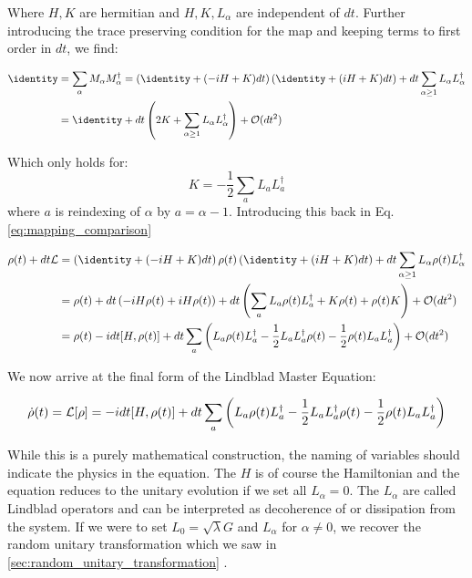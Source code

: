 Where $H, K$ are hermitian and $H, K, L_\alpha$ are independent of $dt$. Further introducing the trace preserving condition for the map and keeping terms to first order in $dt$, we find:
\begin{fullwidth}
\begin{align}
    \identity &= \sum_\alpha M_\alpha M_\alpha^\dagger = \left(\identity + (-iH + K)dt\right)\left(\identity + (iH + K)dt\right) + dt \sum_{\alpha \geq 1} L_\alpha L_\alpha^\dagger \\
    &= \identity + dt \left(2K +  \sum_{\alpha\geq 1} L_\alpha L_\alpha^\dagger\right) + \mathcal{O}(dt^2) 
\end{align}
\end{fullwidth}
Which only holds for:
\begin{equation}
    K = - \frac12 \sum_a L_a L_a^\dagger
\end{equation}
where $a$ is reindexing of $\alpha$ by $a = \alpha - 1$. Introducing this back in Eq. \ref{eq:mapping_comparison} 
\begin{fullwidth}
\begin{align}
    \rho(t) + dt \lindbladian &= \left(\identity + (-iH + K)dt\right)\rho(t)\left(\identity + (iH + K)dt\right) + dt \sum_{\alpha \geq 1} L_\alpha \rho(t) L_\alpha^\dagger \\
    &= \rho(t) + dt \left(-i H \rho(t) + iH \rho(t)\right) + dt \left(\sum_a L_a \rho(t) L_a^\dagger + K \rho(t) + \rho(t) K\right) + \mathcal{O}(dt^2) \\
    &= \rho(t) -i dt[H, \rho(t)] + dt \sum_a \left(L_a \rho(t) L_a^\dagger - \frac12 L_a L_a^\dagger \rho(t) - \frac12 \rho(t)L_a L_a^\dagger  \right) + \mathcal{O}(dt^2)
\end{align}
\end{fullwidth}
We now arrive at the final form of the Lindblad Master Equation:
\begin{fullwidth}
\begin{equation}\label{eq:lindblad_master_equation}
    \dot{\rho}(t) = \mathcal{L}[\rho] = -i dt[H, \rho(t)] +  dt \sum_a \left(L_a \rho(t) L_a^\dagger - \frac12 L_a L_a^\dagger \rho(t) - \frac12 \rho(t)L_a L_a^\dagger  \right)
\end{equation}
\end{fullwidth}
While this is a purely mathematical construction, the naming of variables should indicate the physics in the equation. The $H$ is of course the Hamiltonian and the equation reduces to the unitary evolution if we set all $L_\alpha = 0$. The ${L_\alpha}$ are called Lindblad operators and can be interpreted as decoherence of or dissipation from the system. If we were to set $L_0 = \sqrt{\lambda} G$ and $L_\alpha$ for $\alpha \neq 0$, we recover the random unitary transformation which we saw in \ref{sec:random_unitary_transformation} \cite{preskill_lecture_notes}.


